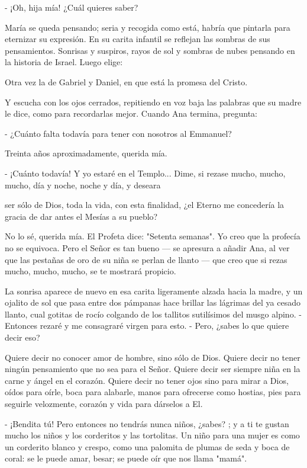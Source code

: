 \documentclass[12pt, twoside, openright]{book} %
\begin{document}
- ¡Oh, hija mía! ¿Cuál quieres saber? 

María se queda pensando; seria y recogida como está, habría que pintarla para eternizar su expresión. En su carita infantil se reflejan las sombras de sus pensamientos. Sonrisas y suspiros, rayos de sol y sombras de nubes pensando en la historia de Israel. Luego elige: 

Otra vez la de Gabriel y Daniel, en que está la promesa del Cristo. 

Y escucha con los ojos cerrados, repitiendo en voz baja las palabras que su madre le dice, como para recordarlas mejor. Cuando Ana termina, pregunta: 

- ¿Cuánto falta todavía para tener con nosotros al Emmanuel? 

Treinta años aproximadamente, querida mía. 

- ¡Cuánto todavía! Y yo estaré en el Templo... Dime, si rezase mucho, mucho, mucho, día y noche, noche y día, y deseara 

ser sólo de Dios, toda la vida, con esta finalidad, ¿el Eterno me concedería la gracia de dar antes el Mesías a su pueblo? 

No lo sé, querida mía. El Profeta dice: "Setenta semanas". Yo creo que la profecía no se equivoca. Pero el Señor es tan bueno — se apresura a añadir Ana, al ver que las pestañas de oro de su niña se perlan de llanto — que creo que si rezas mucho, mucho, mucho, se te mostrará propicio. 

La sonrisa aparece de nuevo en esa carita ligeramente alzada hacia la madre, y un ojalito de sol que pasa entre dos pámpanas hace brillar las lágrimas del ya cesado llanto, cual gotitas de rocío colgando de los tallitos sutilísimos del musgo alpino. - Entonces rezaré y me consagraré virgen para esto. - Pero, ¿sabes lo que quiere decir eso? 

Quiere decir no conocer amor de hombre, sino sólo de Dios. Quiere decir no tener ningún pensamiento que no sea para el Señor. Quiere decir ser siempre niña en la carne y ángel en el corazón. Quiere decir no tener ojos sino para mirar a Dios, oídos para oírle, boca para alabarle, manos para ofrecerse como hostias, pies para seguirle velozmente, corazón y vida para dárselos a El. 

- ¡Bendita tú! Pero entonces no tendrás nunca niños, ¿sabes? ; y a ti te gustan mucho los niños y los corderitos y las tortolitas. Un niño para una mujer es como un corderito blanco y crespo, como una palomita de plumas de seda y boca de coral: se le puede amar, besar; se puede oír que nos llama "mamá". 
\end{document}
